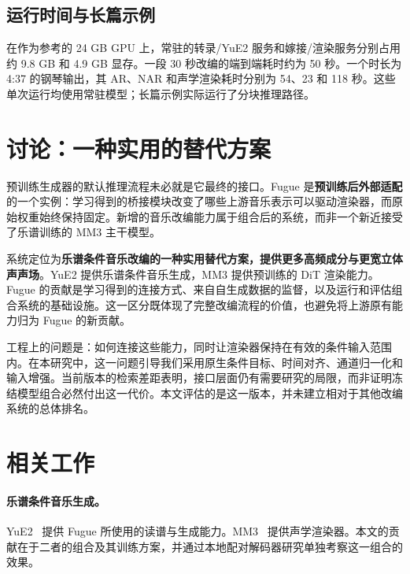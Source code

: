 \documentclass[11pt,a4paper,fontset=fandol]{ctexart}
\begin{document}
\subsection{运行时间与长篇示例}

在作为参考的 24 GB GPU 上，常驻的转录/YuE2 服务和嫁接/渲染服务分别占用约 9.8 GB 和 4.9 GB 显存。一段 30 秒改编的端到端耗时约为 50 秒。一个时长为 4:37 的钢琴输出，其 AR、NAR 和声学渲染耗时分别为 54、23 和 118 秒。这些单次运行均使用常驻模型；长篇示例实际运行了分块推理路径。

\section{讨论：一种实用的替代方案}

预训练生成器的默认推理流程未必就是它最终的接口。Fugue 是\textbf{预训练后外部适配}的一个实例：学习得到的桥接模块改变了哪些上游音乐表示可以驱动渲染器，而原始权重始终保持固定。新增的音乐改编能力属于组合后的系统，而非一个新近接受了乐谱训练的 MM3 主干模型。

系统定位为\textbf{乐谱条件音乐改编的一种实用替代方案，提供更多高频成分与更宽立体声声场}。YuE2 提供乐谱条件音乐生成，MM3 提供预训练的 DiT 渲染能力。Fugue 的贡献是学习得到的连接方式、来自自生成数据的监督，以及运行和评估组合系统的基础设施。这一区分既体现了完整改编流程的价值，也避免将上游原有能力归为 Fugue 的新贡献。

工程上的问题是：如何连接这些能力，同时让渲染器保持在有效的条件输入范围内。在本研究中，这一问题引导我们采用原生条件目标、时间对齐、通道归一化和输入增强。当前版本的检索差距表明，接口层面仍有需要研究的局限，而非证明冻结模型组合必然付出这一代价。本文评估的是这一版本，并未建立相对于其他改编系统的总体排名。

\section{相关工作}

\paragraph{乐谱条件音乐生成。}YuE2~\cite{yue2} 提供 Fugue 所使用的读谱与生成能力。MM3~\cite{mm3} 提供声学渲染器。本文的贡献在于二者的组合及其训练方案，并通过本地配对解码器研究单独考察这一组合的效果。
\end{document}
